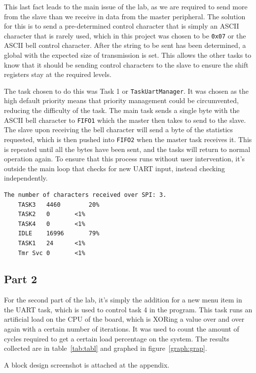 \documentclass{article}
\begin{document}
This last fact leads to the main issue of the lab, as we are required to send more from the slave than we receive in data from the master peripheral. The solution for this is to send a pre-determined control character that is simply an ASCII character that is rarely used, which in this project was chosen to be \verb|0x07| or the ASCII bell control character. After the string to be sent has been determined, a global with the expected size of transmission is set. This allows the other tasks to know that it should be sending control characters to the slave to ensure the shift registers stay at the required levels.

The task chosen to do this was Task 1 or \verb|TaskUartManager|. It was chosen as the high default priority means that priority management could be circumvented, reducing the difficulty of the task. The main task sends a single byte with the ASCII bell character to \verb|FIFO1| which the master then takes to send to the slave. The slave upon receiving the bell character will send a byte of the statistics requested, which is then pushed into \verb|FIFO2| when the master task receives it. This is repeated until all the bytes have been sent, and the tasks will return to normal operation again. To ensure that this process runs without user intervention, it's outside the main loop that checks for new UART input, instead checking independently.
\begin{lstlisting}[caption={Example of output after termination sequence}, label={list1:example}]
    The number of characters received over SPI: 3.
    TASK3	4460		20%
    TASK2	0		<1%
    TASK4	0		<1%
    IDLE	16996		79%
    TASK1	24		<1%
    Tmr Svc	0		<1%
\end{lstlisting}

\subsection{Part 2}
For the second part of the lab, it's simply the addition for a new menu item in the UART task, which is used to control task 4 in the program. This task runs an artificial load on the CPU of the board, which is XORing a value over and over again with a certain number of iterations. It was used to count the amount of cycles required to get a certain load percentage on the system. The results collected are in table~\ref{tab:tabl} and graphed in figure~\ref{graph:grap}.

A block design screenshot is attached at the appendix.
\end{document}
